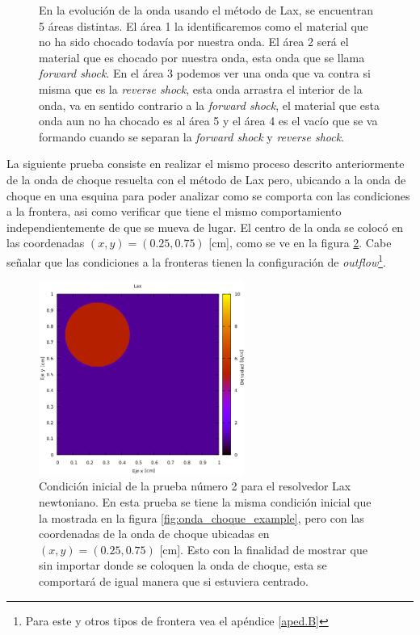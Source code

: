 \documentclass[12pt,a4paper]{book}
\begin{document}
\begin{figure}
\caption{\label{fig:Lax-newtoniano-prueba1-analisis}En la evolución de la onda usando el método de Lax,  se encuentran 5 áreas distintas. El área 1 la identificaremos como el material que no ha sido chocado todavía por nuestra onda. El área 2 será el material que es chocado por nuestra onda, esta onda que se llama \emph{forward shock}. En el área 3 podemos ver una onda que va contra si misma que es la \emph{reverse shock}, esta onda arrastra el interior de la onda, va en sentido contrario a la \emph{forward shock}, el material que esta onda aun no ha chocado es al área 5 y el área 4 es el vacío que se va formando cuando se separan la \emph{forward shock} y \emph{reverse shock}.} 
\end{figure}


La siguiente prueba consiste en realizar el mismo proceso descrito anteriormente de la onda de choque resuelta con el método de Lax pero, ubicando a la onda de choque en una esquina para poder analizar como se comporta con las condiciones a la frontera, asi como verificar que tiene el mismo comportamiento independientemente de que se mueva de lugar. El centro de la onda se colocó en las coordenadas $(x, y) = (0.25, 0.75)$ [cm], como se ve en la figura \ref{fig:onda_choque2_t_0}. Cabe señalar que las condiciones a la fronteras tienen la configuración de \textit{outflow}\footnote{Para este y otros tipos de frontera vea el apéndice \ref{aped.B}}.

\begin{figure} 
\centering
\includegraphics[width=0.6\textwidth]{./Figuras/Pruebas/Prueba_onda_choque/onda_choque2_t_0}
\caption{\label{fig:onda_choque2_t_0}Condición inicial de la prueba número 2 para el resolvedor Lax newtoniano. En esta prueba se tiene la misma condición inicial que la mostrada en la figura \ref{fig:onda_choque_example}, pero con las coordenadas de la onda de choque ubicadas en $(x, y) = (0.25, 0.75)$ [cm]. Esto con la finalidad de mostrar que sin importar donde se coloquen la onda de choque, esta se comportará de igual manera que si estuviera centrado.} 
\end{figure}
\end{document}
